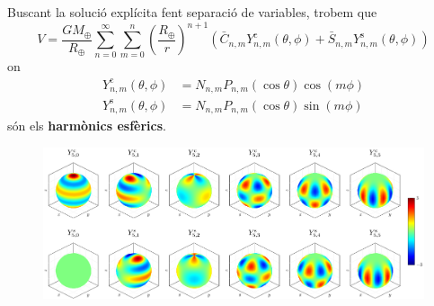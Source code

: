 \documentclass{beamer} %
\begin{document}
\begin{frame}
  Buscant la solució explícita fent separació de variables, trobem que
  \begin{equation*}
    V =\frac{GM_\oplus}{R_\oplus}\sum_{n=0}^\infty \sum_{m=0}^n{\left(\frac{{R_\oplus}}{r}\right)}^{n+1}(\bar{C}_{n,m}Y_{n,m}^{\mathrm{c}}(\theta,\phi)+\bar{S}_{n,m}Y_{n,m}^{\mathrm{s}}(\theta,\phi))
  \end{equation*}
  on
  \begin{align*}
    Y_{n,m}^{\mathrm{c}}(\theta,\phi) & =N_{n,m}P_{n,m}(\cos\theta)\cos(m\phi) \\
    Y_{n,m}^{\mathrm{s}}(\theta,\phi) & =N_{n,m}P_{n,m}(\cos\theta)\sin(m\phi)
  \end{align*}
  són els \textbf{harmònics esfèrics}.
  \begin{figure}
    \centering
    \includegraphics[width=\textwidth]{../Images/sphericalHarmonics.pdf}
  \end{figure}
\end{frame}
\end{document}
